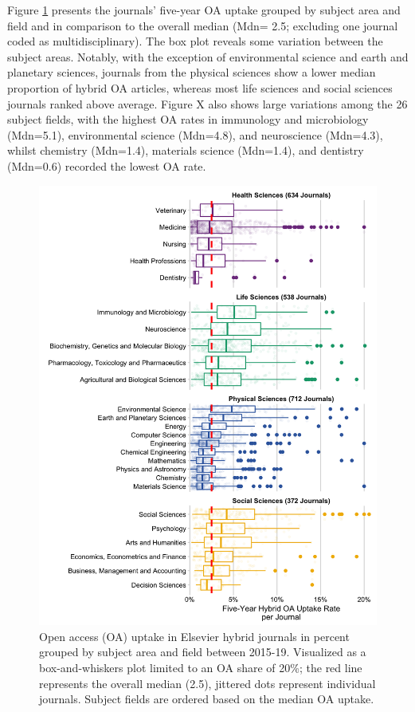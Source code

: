 \documentclass[a4paper,man,floatsintext,longtable,noextraspace,12pt]{apa6}
\begin{document}
Figure \ref{fig:oa_sub_uptake} presents the journals' five-year OA
uptake grouped by subject area and field and in comparison to the
overall median (Mdn= 2.5; excluding one journal coded as
multidisciplinary). The box plot reveals some variation between the
subject areas. Notably, with the exception of environmental science and
earth and planetary sciences, journals from the physical sciences show a
lower median proportion of hybrid OA articles, whereas most life
sciences and social sciences journals ranked above average. Figure X
also shows large variations among the 26 subject fields, with the
highest OA rates in immunology and microbiology (Mdn=5.1), environmental
science (Mdn=4.8), and neuroscience (Mdn=4.3), whilst chemistry
(Mdn=1.4), materials science (Mdn=1.4), and dentistry (Mdn=0.6) recorded
the lowest OA rate.

\begin{figure}[H]

{\centering \includegraphics[width=0.9\linewidth,]{manuscript_files/figure-latex/oa_sub_uptake-1} 

}

\caption{Open access (OA) uptake in Elsevier hybrid journals in percent grouped by subject area and field between 2015-19. Visualized as a box-and-whiskers plot limited to an OA share of 20\%; the red line represents the overall median (2.5), jittered dots represent individual journals. Subject fields are ordered based on the median OA uptake.}\label{fig:oa_sub_uptake}
\end{figure}
\end{document}
